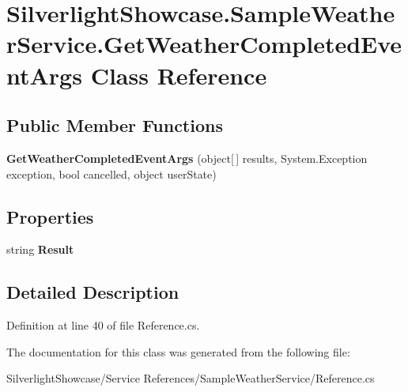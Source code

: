 \hypertarget{class_silverlight_showcase_1_1_sample_weather_service_1_1_get_weather_completed_event_args}{
\section{SilverlightShowcase.SampleWeatherService.GetWeatherCompletedEventArgs Class Reference}
\label{class_silverlight_showcase_1_1_sample_weather_service_1_1_get_weather_completed_event_args}
}
\subsection*{Public Member Functions}
\begin{DoxyCompactItemize}
\item 
\hypertarget{class_silverlight_showcase_1_1_sample_weather_service_1_1_get_weather_completed_event_args_a35f0d4ebe00809172ab75890e4642c4c}{
{\bfseries GetWeatherCompletedEventArgs} (object\mbox{[}$\,$\mbox{]} results, System.Exception exception, bool cancelled, object userState)}
\label{class_silverlight_showcase_1_1_sample_weather_service_1_1_get_weather_completed_event_args_a35f0d4ebe00809172ab75890e4642c4c}

\end{DoxyCompactItemize}
\subsection*{Properties}
\begin{DoxyCompactItemize}
\item 
\hypertarget{class_silverlight_showcase_1_1_sample_weather_service_1_1_get_weather_completed_event_args_a5b0e69be5abb93f4d31410743ae7dddc}{
string {\bfseries Result}}
\label{class_silverlight_showcase_1_1_sample_weather_service_1_1_get_weather_completed_event_args_a5b0e69be5abb93f4d31410743ae7dddc}

\end{DoxyCompactItemize}


\subsection{Detailed Description}


Definition at line 40 of file Reference.cs.

The documentation for this class was generated from the following file:\begin{DoxyCompactItemize}
\item 
SilverlightShowcase/Service References/SampleWeatherService/Reference.cs\end{DoxyCompactItemize}
